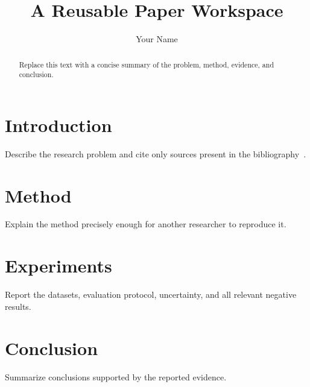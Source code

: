 \documentclass[letterpaper]{article}
\title{A Reusable Paper Workspace}
\author{Your Name}
\begin{document}
\maketitle
\begin{abstract}
Replace this text with a concise summary of the problem, method, evidence, and conclusion.
\end{abstract}
\section{Introduction}
Describe the research problem and cite only sources present in the bibliography~\cite{lamport1994latex}.
\section{Method}
Explain the method precisely enough for another researcher to reproduce it.
\section{Experiments}
Report the datasets, evaluation protocol, uncertainty, and all relevant negative results.
\section{Conclusion}
Summarize conclusions supported by the reported evidence.


\end{document}

